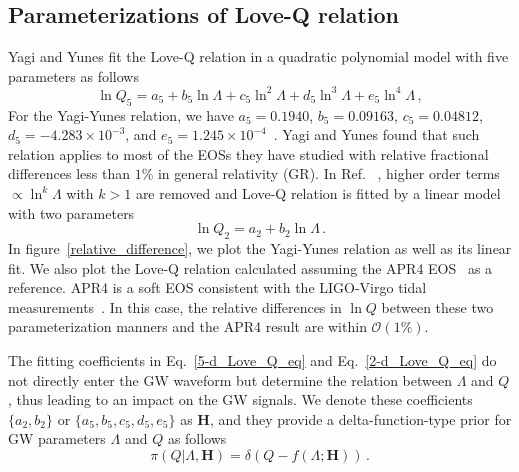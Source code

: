 \documentclass[a4paper,11pt]{article}
\begin{document}
\subsection{Parameterizations of Love-Q relation} 
\label{subsec:framework_parameterization}
Yagi and Yunes fit the Love-Q relation in a quadratic polynomial model with five 
parameters as follows~\cite{Yagi:2013bca,Yagi:2013awa,Yagi_2017}
\begin{equation}
\label{5-d_Love_Q_eq}
    \ln Q_{5}=a_5 + b_5 \ln \Lambda + c_5 \ln^2\Lambda + d_5 \ln^3\Lambda + e_5 \ln^4 \Lambda\,,
\end{equation}
For the Yagi-Yunes relation, we have $a_5=0.1940$, $b_5=0.09163$, $c_5=0.04812$, 
$d_5=-4.283\times10^{-3}$, and $e_5=1.245\times10^{-4}$~\cite{Yagi_2017}. Yagi and 
Yunes found that such relation applies to most of the EOSs they have studied with 
relative fractional differences less than $1\%$ in general relativity (GR). In Ref.
~\cite{Samajdar:2020xrd}, higher order terms $\propto \ln^k \Lambda$ with $k>1$ 
are removed and Love-Q relation is fitted by a linear model with two parameters
\begin{equation}
\label{2-d_Love_Q_eq}
    \ln Q_{2} = a_2 + b_2 \ln \Lambda\,.
\end{equation}
In figure~\ref{relative_difference}, we plot the Yagi-Yunes relation as well as 
its linear fit. We also plot the Love-Q relation calculated assuming the APR4 
EOS~\cite{PhysRevC.58.1804} as a reference. APR4 is a soft EOS consistent with the 
LIGO-Virgo tidal measurements~\cite{LIGOScientific:2017vwq,LIGOScientific:2018cki,
LIGOScientific:2018hze}. In this case, the relative differences in $\ln Q$ between 
these two parameterization manners and the APR4 result are within $\mathcal{O}(1\%)$. 

The fitting coefficients in Eq.~\eqref{5-d_Love_Q_eq} and Eq.~\eqref{2-d_Love_Q_eq} 
do not directly enter the GW waveform but determine the relation between $\Lambda$ and $Q$, 
thus leading to an impact on the GW signals. We denote these coefficients $\{a_2, b_2\}$ or 
$\{a_5, b_5, c_5, d_5, e_5\}$ as $\bm{H}$, and they provide a delta-function-type prior for GW parameters $\Lambda$ and $Q$ as follows
\begin{equation}
\label{delta function prior}
\pi(Q|\Lambda,\bm{H}) = \delta(Q-f(\Lambda;\bm{H}))\,.
\end{equation}
\end{document}
